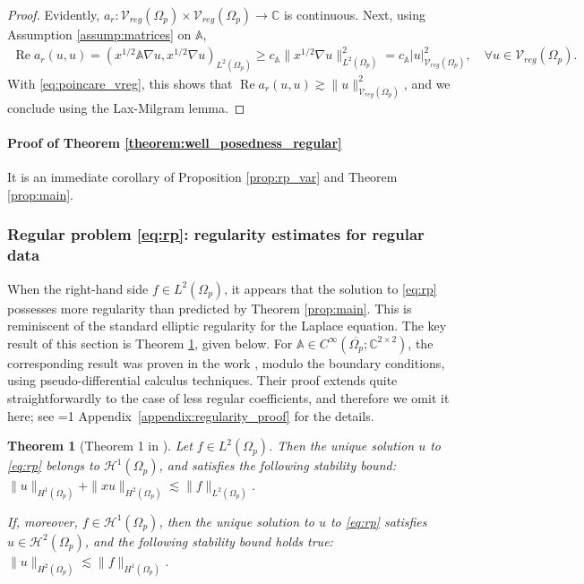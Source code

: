 \documentclass[report]{elsarticle}
\newtheorem{theorem}{Theorem}[section]
\newtheorem{remark}[theorem]{Remark}
\numberwithin{theorem}{section}
\renewcommand{\Re}{\operatorname{Re}}
\newcommand{\isreport}{1}
\newcommand{\citeappendixregularity}{
	\ifnum\isreport=1
	Appendix~\ref{appendix:regularity_proof}
	\else
	\cite[Appendix D]{mk_peillon}
	\fi
}
\begin{document}
\begin{proof} 
	Evidently, $a_r: \mathcal{V}_{reg}(\Omega_p)\times \mathcal{V}_{reg}(\Omega_p)\rightarrow \mathbb{C}$ is continuous. Next, using Assumption  \ref{assump:matrices} on $\mathbb{A}$, 
	\begin{align}
		\Re a_r(u, u)=(x^{1/2}\mathbb{A}\nabla u,x^{1/2}\nabla u)_{L^2(\Omega_p)}\geq c_{\mathbb{A}}\|x^{1/2}\nabla u\|_{L^2(\Omega_p)}^2=c_{\mathbb{A}}|u|_{\mathcal{V}_{reg}(\Omega_p)}^2,\quad \forall u\in \mathcal{V}_{reg}(\Omega_p).	
	\end{align}
	With \eqref{eq:poincare_vreg}, this shows that $\Re a_r(u,u)\gtrsim \|u\|_{\mathcal{V}_{reg}(\Omega_p)}^2$, and we conclude using the Lax-Milgram lemma.
\end{proof}
\paragraph{Proof of Theorem \ref{theorem:well_posedness_regular}}It is an immediate corollary of Proposition \ref{prop:rp_var} and Theorem \ref{prop:main}. 
\subsubsection{Regular problem \eqref{eq:rp}: regularity estimates for regular data}
When the right-hand side $f\in L^2(\Omega_p)$, it appears that the solution to \eqref{eq:rp} possesses more regularity than predicted by Theorem \ref{prop:main}. This is reminiscent of the standard elliptic regularity for the Laplace equation. The key result of this section is Theorem \ref{theorem:regularity}, given below. 
For $\mathbb{A}\in C^{\infty}(\overline{\Omega_p}; \mathbb{C}^{2\times 2})$, the corresponding result was proven in the work \cite{baouendi_goulaouic}, modulo the boundary conditions, using pseudo-differential calculus techniques. Their proof extends quite straightforwardly to the case of less regular coefficients, and therefore we omit it here; see \citeappendixregularity for the details.
\begin{theorem}[Theorem 1 in \cite{baouendi_goulaouic}]
	\label{theorem:regularity}
	Let $f\in L^2(\Omega_p)$. Then the unique solution $u$ to  \eqref{eq:rp} belongs to $\mathcal{H}^1(\Omega_p)$, and satisfies the following stability bound: $\|u\|_{H^1(\Omega_p)}+\| x  u\|_{H^2(\Omega_p)}\lesssim \|f\|_{L^2(\Omega_p)}$. 
	
	If, moreover, $f\in \mathcal{H}^1(\Omega_p)$, then the unique solution to $u$ to  \eqref{eq:rp} satisfies $u\in \mathcal{H}^2(\Omega_p)$, and the following stability bound holds true: $\|u\|_{H^2(\Omega_p)}\lesssim \|f\|_{H^1(\Omega_p)}$. 
\end{theorem}
\end{document}
